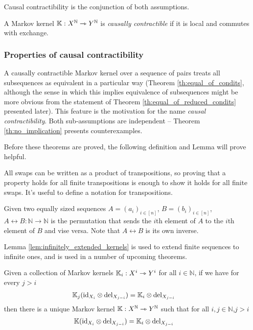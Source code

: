 Causal contractibility is the conjunction of both assumptions.
\begin{definition}
A Markov kernel $\mathbb{K}:X^{\mathbb{N}}\rightarrowtriangle Y^{\mathbb{N}}$ is \emph{causally contractible} if it is local and commutes with exchange.
\end{definition}

\subsubsection{Properties of causal contractibility}

A causally contractible Markov kernel over a sequence of pairs treats all subsequences as equivalent in a particular way (Theorem \ref{th:equal_of_condits}, although the sense in which this implies equivalence of subsequences might be more obvious from the statement of Theorem \ref{th:equal_of_reduced_condits} presented later). This feature is the motivation for the name \emph{causal contractibility}. Both sub-assumptions are independent -- Theorem \ref{th:no_implication} presents counterexamples.

Before these theorems are proved, the following definition and Lemma will prove helpful.

All swaps can be written as a product of transpositions, so proving that a property holds for all finite transpositions is enough to show it holds for all finite swaps. It's useful to define a notation for transpositions.
\begin{definition}
Given two equally sized sequences $A=(a_i)_{i\in [n]}$, $B=(b_i)_{i\in [n]}$, ${A\leftrightarrow B}:\mathbb{N}\to \mathbb{N}$ is the permutation that sends the $i$th element of $A$ to the $i$th element of $B$ and vise versa. Note that $A\leftrightarrow B$ is its own inverse.
\end{definition}

Lemma \ref{lem:infinitely_extended_kernels} is used to extend finite sequences to infinite ones, and is used in a number of upcoming theorems.

\begin{lemma}\label{lem:infinitely_extended_kernels}
Given a collection of Markov kernels $\mathbb{K}_i:X^i\rightarrowtriangle Y^i$ for all $i\in \mathbb{N}$, if we have for every $j>i$
\begin{align}
    \mathbb{K}_j(\text{id}_{X_i}\otimes \text{del}_{X_{j-i}}) &= \mathbb{K}_i\otimes \text{del}_{X_{j-i}}\label{eq:marginalise_comb}
\end{align} 
then there is a unique Markov kernel $\mathbb{K}:X^{\mathbb{N}}\rightarrowtriangle Y^{\mathbb{N}}$ such that for all $i,j\in \mathbb{N}$,$j>i$
\begin{align}
    \mathbb{K}(\text{id}_{X_i}\otimes \text{del}_{X_{j-i}})&= \mathbb{K}_i\otimes \text{del}_{X_{j-i}}
\end{align}
\end{lemma}

